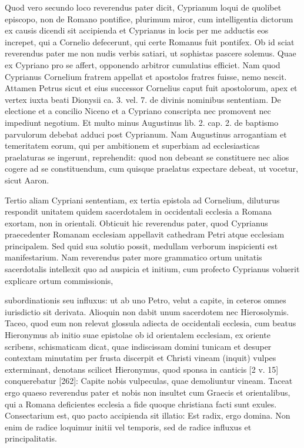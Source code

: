 Quod vero secundo loco reverendus pater dicit, Cyprianum loqui de quolibet episcopo, non de Romano pontifice, plurimum miror, cum intelligentia dictorum ex causis dicendi sit accipienda et Cyprianus in locis per me adductis eos increpet, qui a Cornelio defecerunt, qui certe Romanus fuit pontifex. Ob id sciat reverendus pater me non nudis verbis satiari, ut sophistas pascere solemus. Quae ex Cypriano pro se affert, opponendo arbitror cumulatius efficiet. Nam quod Cyprianus Cornelium fratrem appellat et apostolos fratres fuisse, nemo nescit. Attamen Petrus sicut et eius successor Cornelius caput fuit apostolorum, apex et vertex iuxta beati Dionysii ca. 3. vel. 7. de divinis nominibus sententiam. De electione et a concilio Niceno et a Cypriano conscripta nec promovent nec impediunt negotium. Et multo minus Augustinus lib. 2. cap. 2. de baptismo parvulorum debebat adduci post Cyprianum. Nam Augustinus arrogantiam et temeritatem eorum, qui per ambitionem et superbiam ad ecclesiasticas praelaturas se ingerunt, reprehendit: quod non debeant se constituere nec alios cogere ad se constituendum, cum quisque praelatus expectare debeat, ut vocetur, sicut Aaron.

Tertio aliam Cypriani sententiam, ex tertia epistola ad Cornelium, diluturus respondit unitatem quidem sacerdotalem in occidentali ecclesia a Romana exortam, non in orientali. Obticuit hic reverendus pater, quod Cyprianus praecedenter Romanam ecclesiam appellavit cathedram Petri atque ecclesiam principalem. Sed quid sua solutio possit, medullam verborum inspicienti est manifestarium. Nam reverendus pater more grammatico ortum unitatis sacerdotalis intellexit quo ad auspicia et initium, cum profecto Cyprianus voluerit explicare ortum commissionis,

subordinationis seu influxus: ut ab uno Petro, velut a capite, in ceteros omnes iurisdictio sit derivata. Alioquin non dabit unum sacerdotem nec Hierosolymis. Taceo, quod eum non relevat glossula adiecta de occidentali ecclesia, cum beatus Hieronymus ab initio suae epistolae ob id orientalem ecclesiam, ex oriente scribens, schismaticam dicat, quae indiscissam domini tunicam et desuper contextam minutatim per frusta discerpit et Christi vineam (inquit) vulpes exterminant, denotans scilicet Hieronymus, quod sponsa in canticis [2 v. 15] conquerebatur [262]: Capite nobis vulpeculas, quae demoliuntur vineam. Taceat ergo quaeso reverendus pater et nobis non insultet cum Graecis et orientalibus, qui a Romana deficientes ecclesia a fide quoque christiana facti sunt exules. Consectarium est, quo pacto accipienda sit illatio: Est radix, ergo domina. Non enim de radice loquimur initii vel temporis, sed de radice influxus et principalitatis.

